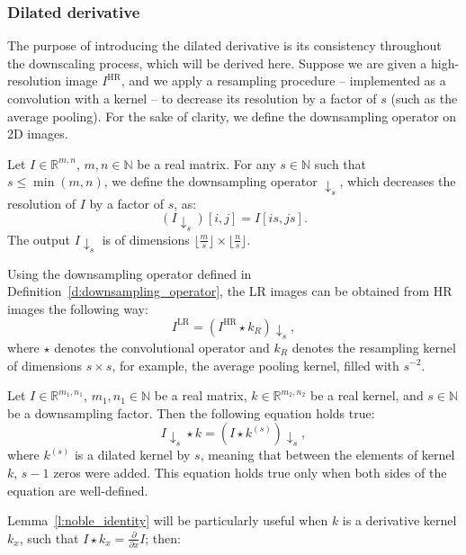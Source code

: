 \subsubsection{Dilated derivative}
\label{ss:dilated_sr_derivative}

The purpose of introducing the dilated derivative is its consistency throughout the downscaling process, which will be derived here.
Suppose we are given a high-resolution image $I^\text{HR}$, and we apply a resampling procedure -- implemented as a convolution with a kernel -- to decrease its resolution by a factor of $s$ (such as the average pooling).
For the sake of clarity, we define the downsampling operator on 2D images.

\begin{definition}
Let $I \in \mathbb{R}^{m,n}$, $m,n\in\mathbb{N}$ be a real matrix.
For any $s \in \mathbb{N}$ such that $s \le \min(m,n)$, we define the downsampling operator $\downarrow_s$, which decreases the resolution of $I$ by a factor of $s$, as:
$$(I{\downarrow_s})[i,j] = I[is, js].$$
The output $I{\downarrow_s}$ is of dimensions $\lfloor\frac{m}{s}\rfloor \times \lfloor\frac{n}{s}\rfloor$.
\label{d:downsampling_operator}
\end{definition}
Using the downsampling operator defined in Definition~\ref{d:downsampling_operator}, the LR images can be obtained from HR images the following way:
\begin{equation}
I^\text{LR} = \left(I^\text{HR} \star k_R\right)\downarrow_s,     
\end{equation}
where $\star$ denotes the convolutional operator and $k_R$ denotes the resampling kernel of dimensions $s\times s$, for example, the average pooling kernel, filled with $s^{-2}$.
\begin{lemma}
Let $I \in \mathbb{R}^{m_1,n_1}$, $m_1,n_1\in\mathbb{N}$ be a real matrix, $k \in \mathbb{R}^{m_2, n_2}$ be a real kernel, and $s\in \mathbb{N}$ be a downsampling factor.
Then the following equation holds true:
$$I{\downarrow_s}\star k = \left(I \star k^{(s)}\right){\downarrow_s},$$
where $k^{(s)}$ is a dilated kernel by $s$, meaning that between the elements of kernel $k$, $s-1$ zeros were added. 
This equation holds true only when both sides of the equation are well-defined.
\cite{Smith2011}
\label{l:noble_identity}
\end{lemma}
Lemma~\ref{l:noble_identity} will be particularly useful when $k$ is a derivative kernel $k_x$, such that $I \star k_x = \frac{\partial}{\partial x} I$; then:
